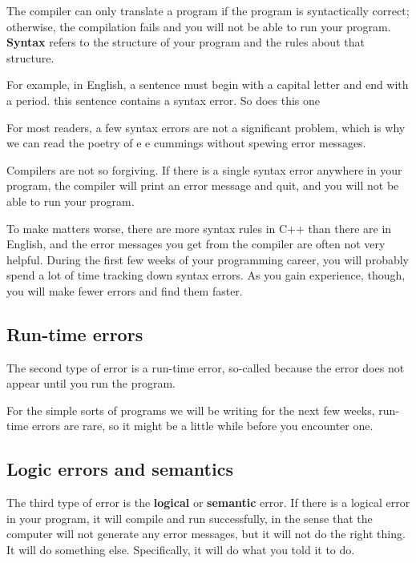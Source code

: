 The compiler can only translate a program if the program is
syntactically correct; otherwise, the compilation fails and
you will not be able to run your program.  {\bf Syntax}
refers to the structure of your program and the rules about
that structure.


For example, in English, a sentence must begin with a capital
letter and end with a period.  this sentence contains a syntax
error.  So does this one

For most readers, a few syntax errors are not a significant
problem, which is why we can read the poetry of e e cummings
without spewing error messages.

Compilers are not so forgiving.  If there is a single syntax
error anywhere in your program, the compiler will print an
error message and quit, and you will not be able to run
your program.

To make matters worse, there are more syntax rules in C++
than there are in English, and the error messages you get from
the compiler are often not very helpful.  During the first
few weeks of your programming career, you will probably
spend a lot of time tracking down syntax errors.  As you
gain experience, though, you will make fewer errors and find
them faster.

\subsection{Run-time errors}
\label{run-time}

The second type of error is a run-time error, so-called because
the error does not appear until you run the program.

For the simple sorts of programs we will be writing for the
next few weeks, run-time errors are rare, so it might be a little
while before you encounter one.


\subsection{Logic errors and semantics}

The third type of error is the {\bf logical} or {\bf semantic}
error.  If there is a logical error in your program, it will
compile and run successfully, in the sense that the computer
will not generate any error messages, but it will not do the
right thing.  It will do something else.  Specifically, it will
do what you told it to do.

